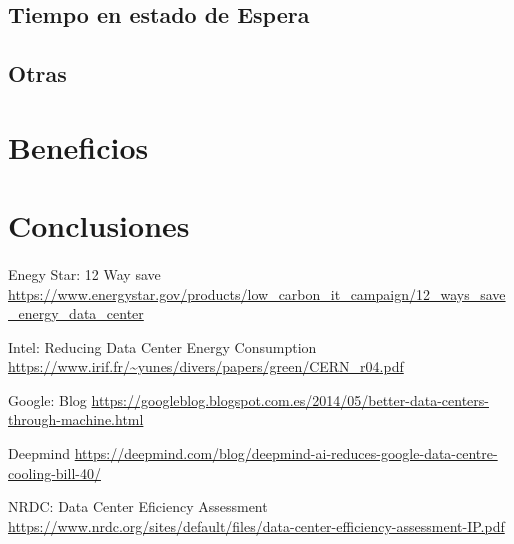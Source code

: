 \documentclass[10pt]{article}
\begin{document}
			\paragraph{}


		\subsection{Tiempo en estado de Espera}

			\paragraph{}


		\subsection{Otras}

			\paragraph{}


    \section{Beneficios}
	\label{sec:beneficios}

    	\paragraph{}

    \section{Conclusiones}
	\label{sec:conclusiones}

    	\paragraph{}
	\clearpage
    \begin{thebibliography}{9}

  		Enegy Star: 12 Way save \url{https://www.energystar.gov/products/low_carbon_it_campaign/12_ways_save_energy_data_center}

        Intel: Reducing Data Center Energy Consumption \url{https://www.irif.fr/~yunes/divers/papers/green/CERN_r04.pdf}

        Google: Blog \url{https://googleblog.blogspot.com.es/2014/05/better-data-centers-through-machine.html}

        Deepmind \url{https://deepmind.com/blog/deepmind-ai-reduces-google-data-centre-cooling-bill-40/}

        NRDC: Data Center Eficiency Assessment \url{https://www.nrdc.org/sites/default/files/data-center-efficiency-assessment-IP.pdf}

	\end{thebibliography}
\end{document}
